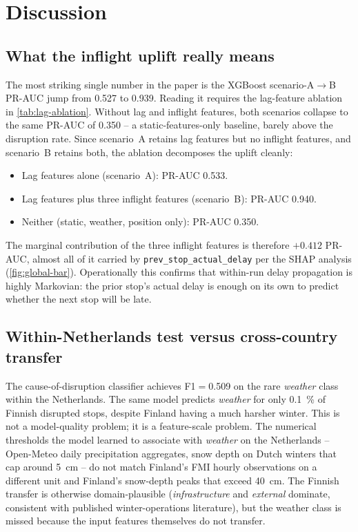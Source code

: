 \section{Discussion}
\label{sec:discussion}

\subsection{What the inflight uplift really means}

The most striking single number in the paper is the XGBoost scenario-A$\to$B PR-AUC jump from \num{0.527} to \num{0.939}. Reading it requires the lag-feature ablation in \cref{tab:lag-ablation}. Without lag and inflight features, both scenarios collapse to the same PR-AUC of \num{0.350} -- a static-features-only baseline, barely above the disruption rate. Since scenario~A retains lag features but no inflight features, and scenario~B retains both, the ablation decomposes the uplift cleanly:

\begin{itemize}
    \item Lag features alone (scenario~A): PR-AUC \num{0.533}.
    \item Lag features plus three inflight features (scenario~B): PR-AUC \num{0.940}.
    \item Neither (static, weather, position only): PR-AUC \num{0.350}.
\end{itemize}

The marginal contribution of the three inflight features is therefore $+\num{0.412}$ PR-AUC, almost all of it carried by \texttt{prev\_stop\_actual\_delay} per the SHAP analysis (\cref{fig:global-bar}). Operationally this confirms that within-run delay propagation is highly Markovian: the prior stop's actual delay is enough on its own to predict whether the next stop will be late.

\subsection{Within-Netherlands test versus cross-country transfer}

The cause-of-disruption classifier achieves F1$=$\num{0.509} on the rare \emph{weather} class within the Netherlands. The same model predicts \emph{weather} for only \SI{0.1}{\percent} of Finnish disrupted stops, despite Finland having a much harsher winter. This is not a model-quality problem; it is a feature-scale problem. The numerical thresholds the model learned to associate with \emph{weather} on the Netherlands -- Open-Meteo daily precipitation aggregates, snow depth on Dutch winters that cap around \SI{5}{cm} -- do not match Finland's FMI hourly observations on a different unit and Finland's snow-depth peaks that exceed \SI{40}{cm}. The Finnish transfer is otherwise domain-plausible (\emph{infrastructure} and \emph{external} dominate, consistent with published winter-operations literature), but the weather class is missed because the input features themselves do not transfer.

